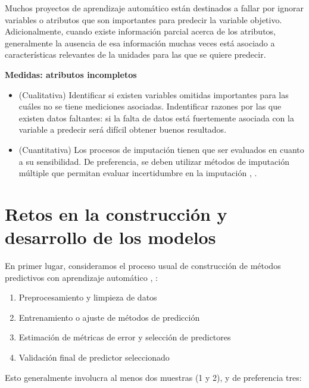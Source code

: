 \documentclass[
]{book}
\providecommand{\tightlist}{%
  \setlength{\itemsep}{0pt}\setlength{\parskip}{0pt}}
\let\BeginKnitrBlock\begin \let\EndKnitrBlock\end
\begin{document}
Muchos proyectos de aprendizaje automático están destinados a fallar por ignorar variables o atributos que
son importantes para predecir la variable objetivo. Adicionalmente, cuando existe información parcial acerca
de los atributos, generalmente la ausencia de esa información muchas veces está asociado a características relevantes
de la unidades para las que se quiere predecir.

\BeginKnitrBlock{rmdtip}
\textbf{Medidas: atributos incompletos}

\begin{itemize}
\item
  (Cualitativa) Identificar si existen variables omitidas importantes para las cuáles no se tiene
  mediciones asociadas. Indentificar razones por las que existen datos faltantes: si la falta de datos está
  fuertemente asociada con la variable a predecir será difícil obtener buenos resultados.
\item
  (Cuantitativa) Los procesos de imputación tienen que ser evaluados en cuanto a su sensibilidad. De preferencia,
  se deben utilizar métodos de imputación múltiple que permitan evaluar incertidumbre en la imputación \citep{missingrubin}, \citep{mice}.
\end{itemize}
\EndKnitrBlock{rmdtip}

\hypertarget{retos-en-la-construcciuxf3n-y-desarrollo-de-los-modelos}{%
\chapter{Retos en la construcción y desarrollo de los modelos}\label{retos-en-la-construcciuxf3n-y-desarrollo-de-los-modelos}}

En primer lugar, consideramos el proceso usual de construcción de métodos predictivos
con aprendizaje automático \citep{ESL}, \citep{kuhn}:

\begin{enumerate}
\def\labelenumi{\arabic{enumi}.}
\tightlist
\item
  Preprocesamiento y limpieza de datos
\item
  Entrenamiento o ajuste de métodos de predicción
\item
  Estimación de métricas de error y selección de predictores
\item
  Validación final de predictor seleccionado
\end{enumerate}

Esto generalmente involucra al menos dos muestras (1 y 2), y de preferencia tres:
\end{document}
